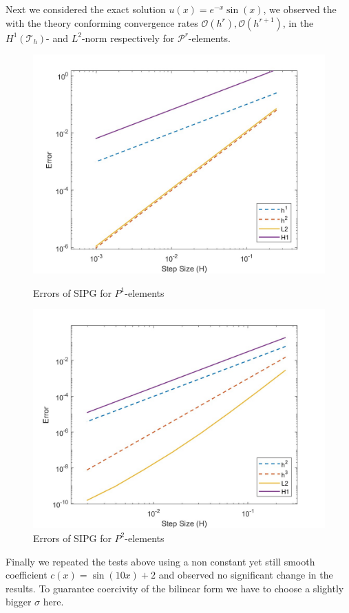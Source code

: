 Next we considered the exact solution $u(x) = e^{-x} \sin(x)$, we observed the with the theory conforming convergence rates 
$\mathcal{O}(h^r), \mathcal{O}(h^{r+1})$, in the $H^1(\mathcal{T}_h)$- and $L^2$-norm respectively for $\mathcal{P}^r$-elements.

\begin{figure}[h!]
    \centering
    
    \begin{minipage}[t]{0.48\textwidth}
        \centering
        \includegraphics[width=\linewidth]{figures/dg_elliptic_uniform_mesh_exact_sol_errors_P1.jpg}
        \caption{Errors of SIPG for $P^1$-elements}
        \label{fig:elliptic_uniform_mesh_p1}
    \end{minipage}
    \hfill
    \begin{minipage}[t]{0.48\textwidth}
        \centering
        \includegraphics[width=\linewidth]{figures/dg_elliptic_uniform_mesh_exact_sol_errors_P2.jpg}
        \caption{Errors of SIPG for $P^2$-elements}
        \label{fig:elliptic_uniform_mesh_p2}
    \end{minipage}
\end{figure}

Finally we repeated the tests above using a non constant yet still smooth coefficient $c(x) = \sin(10x) + 2$ and observed no significant change in the results. 
To guarantee coercivity of the bilinear form we have to choose a slightly bigger $\sigma$ here.